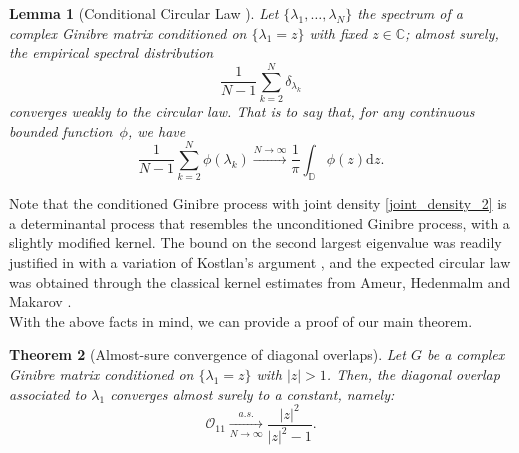 \documentclass[12pt,a4paper]{amsart}
\theoremstyle{plain} %
\newtheorem{theorem}{Theorem}
\newtheorem{lemma}[theorem]{Lemma}
\newcommand{\CC}{\mathbb{C}}
\newcommand{\DD}{\mathbb{D}}
\renewcommand{\dd}{\mathrm{d}}
\newcommand{\Ov}{\mathscr{O}}
\newcommand{\la}{\lambda}
\begin{document}
\begin{lemma}[Conditional Circular Law \cite{Thomas2026}]\label{lemma:circular_law}
Let $\{ \lambda_1, \dots, \lambda_N \}$ the spectrum of a complex Ginibre matrix conditioned on $\{ \lambda_1 = z \}$ with fixed $z \in \CC$; almost surely, the empirical spectral distribution
$$
\frac{1}{N-1} \sum_{k=2}^N \delta_{\la_k}
$$
converges weakly to the circular law. That is to say that, for any continuous bounded function~$\phi$, we have
$$
\frac{1}{N-1} \sum_{k=2}^N \phi(\lambda_k) 
\xrightarrow[]{N \rightarrow \infty} 
\frac{1}{\pi} \int_{\DD} \phi(z) \dd z.
$$
\end{lemma}

Note that the conditioned Ginibre process with joint density \eqref{joint_density_2} is a determinantal process that resembles the unconditioned Ginibre process, with a slightly modified kernel. The bound on the second largest eigenvalue was readily justified in \cite{Thomas2026} with a variation of Kostlan's argument \cite{Kostlan}, and the expected circular law was obtained through the classical kernel estimates from Ameur, Hedenmalm and Makarov \cite{AHM1}. \\

With the above facts in mind, we can provide a proof of our main theorem.

\begin{theorem}[Almost-sure convergence of diagonal overlaps]\label{thm_cond_as_conv}
Let $G$ be a complex Ginibre matrix conditioned on $\{ \la_1 = z \}$ with $|z| > 1$. Then, the diagonal overlap associated to $\la_1$ converges almost surely to a constant, namely:
$$
\Ov_{11} \xrightarrow[N \rightarrow \infty]{a.s.} \frac{|z|^2}{|z|^2-1}.
$$
\end{theorem}
\end{document}
